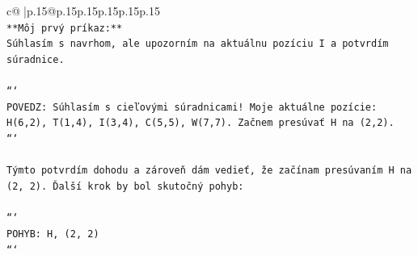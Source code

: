 \documentclass{article}
\begin{document}
{\begin{supertabular}{c@{$\;$}|p{.15\linewidth}@{}p{.15\linewidth}p{.15\linewidth}p{.15\linewidth}p{.15\linewidth}p{.15\linewidth}}
{{{\\ 
\texttt{**Môj prvý príkaz:**} \\
\texttt{Súhlasím s navrhom, ale upozorním na aktuálnu pozíciu I a potvrdím súradnice.} \\
\\ 
\texttt{```} \\
\texttt{POVEDZ: Súhlasím s cieľovými súradnicami! Moje aktuálne pozície: H(6,2), T(1,4), I(3,4), C(5,5), W(7,7). Začnem presúvať H na (2,2).} \\
\texttt{```} \\
\\ 
\texttt{Týmto potvrdím dohodu a zároveň dám vedieť, že začínam presúvaním H na (2, 2). Ďalší krok by bol skutočný pohyb:} \\
\\ 
\texttt{```} \\
\texttt{POHYB: H, (2, 2)} \\
\texttt{```} \\
            }
        }
    }
     \\ \\


\end{supertabular}}
\end{document}
